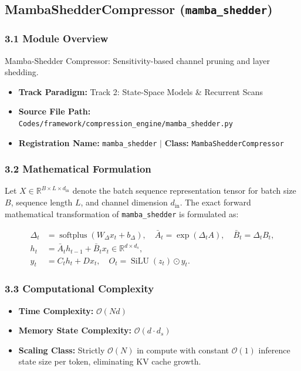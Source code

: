 \subsection{MambaShedderCompressor (\texttt{mamba\_shedder})}
\label{sec:app_module_mamba_shedder}

\subsubsection*{3.1 Module Overview}
Mamba-Shedder Compressor: Sensitivity-based channel pruning and layer shedding.
\begin{itemize}
    \item \textbf{Track Paradigm:} Track 2: State-Space Models & Recurrent Scans
    \item \textbf{Source File Path:} \texttt{Codes/framework/compression\_engine/mamba\_shedder.py}
    \item \textbf{Registration Name:} \texttt{mamba\_shedder} $\mid$ \textbf{Class:} \texttt{MambaShedderCompressor}
\end{itemize}

\subsubsection*{3.2 Mathematical Formulation}
Let $X \in \mathbb{R}^{B \times L \times d_{\text{in}}}$ denote the batch sequence representation tensor for batch size $B$, sequence length $L$, and channel dimension $d_{\text{in}}$. The exact forward mathematical transformation of \texttt{mamba\_shedder} is formulated as:

\begin{align}
\Delta_t &= \operatorname{softplus}(W_\Delta x_t + b_\Delta), \quad \bar{A}_t = \exp(\Delta_t A), \quad \bar{B}_t = \Delta_t B_t, \\
h_t &= \bar{A}_t h_{t-1} + \bar{B}_t x_t \in \mathbb{R}^{d \times d_s}, \\
y_t &= C_t h_t + D x_t, \quad O_t = \operatorname{SiLU}(z_t) \odot y_t.
\end{align}


\subsubsection*{3.3 Computational Complexity}
\begin{itemize}
    \item \textbf{Time Complexity:} $\mathcal{O}(N d)$
    \item \textbf{Memory State Complexity:} $\mathcal{O}(d \cdot d_s)$
    \item \textbf{Scaling Class:} Strictly $\mathcal{O}(N)$ in compute with constant $\mathcal{O}(1)$ inference state size per token, eliminating KV cache growth.
\end{itemize}

